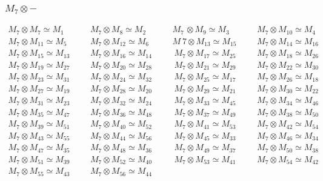 \subsubsection{$M_7\otimes -$}
\begin{align*}
M_{7} \otimes M_{7} \simeq M_{1} &&& M_{7} \otimes M_{8} \simeq M_{2} &&& M_{7\
} \otimes M_{9} \simeq M_{3} &&& M_{7} \otimes M_{10} \simeq M_{4}\\
M_{7} \otimes M_{11} \simeq M_{5} &&& M_{7} \otimes M_{12} \simeq M_{6} &&& M_\
{7} \otimes M_{13} \simeq M_{15} &&& M_{7} \otimes M_{14} \simeq M_{16}\\
M_{7} \otimes M_{15} \simeq M_{13} &&& M_{7} \otimes M_{16} \simeq M_{14} &&& \
M_{7} \otimes M_{17} \simeq M_{25} &&& M_{7} \otimes M_{18} \simeq M_{26}\\
M_{7} \otimes M_{19} \simeq M_{27} &&& M_{7} \otimes M_{20} \simeq M_{28} &&& \
M_{7} \otimes M_{21} \simeq M_{29} &&& M_{7} \otimes M_{22} \simeq M_{30}\\
M_{7} \otimes M_{23} \simeq M_{31} &&& M_{7} \otimes M_{24} \simeq M_{32} &&& \
M_{7} \otimes M_{25} \simeq M_{17} &&& M_{7} \otimes M_{26} \simeq M_{18}\\
M_{7} \otimes M_{27} \simeq M_{19} &&& M_{7} \otimes M_{28} \simeq M_{20} &&& \
M_{7} \otimes M_{29} \simeq M_{21} &&& M_{7} \otimes M_{30} \simeq M_{22}\\
M_{7} \otimes M_{31} \simeq M_{23} &&& M_{7} \otimes M_{32} \simeq M_{24} &&& \
M_{7} \otimes M_{33} \simeq M_{45} &&& M_{7} \otimes M_{34} \simeq M_{46}\\
M_{7} \otimes M_{35} \simeq M_{47} &&& M_{7} \otimes M_{36} \simeq M_{48} &&& \
M_{7} \otimes M_{37} \simeq M_{49} &&& M_{7} \otimes M_{38} \simeq M_{50}\\
M_{7} \otimes M_{39} \simeq M_{51} &&& M_{7} \otimes M_{40} \simeq M_{52} &&& \
M_{7} \otimes M_{41} \simeq M_{53} &&& M_{7} \otimes M_{42} \simeq M_{54}\\
M_{7} \otimes M_{43} \simeq M_{55} &&& M_{7} \otimes M_{44} \simeq M_{56} &&& \
M_{7} \otimes M_{45} \simeq M_{33} &&& M_{7} \otimes M_{46} \simeq M_{34}\\
M_{7} \otimes M_{47} \simeq M_{35} &&& M_{7} \otimes M_{48} \simeq M_{36} &&& \
M_{7} \otimes M_{49} \simeq M_{37} &&& M_{7} \otimes M_{50} \simeq M_{38}\\
M_{7} \otimes M_{51} \simeq M_{39} &&& M_{7} \otimes M_{52} \simeq M_{40} &&& \
M_{7} \otimes M_{53} \simeq M_{41} &&& M_{7} \otimes M_{54} \simeq M_{42}\\
M_{7} \otimes M_{55} \simeq M_{43} &&& M_{7} \otimes M_{56} \simeq M_{44}\\
\end{align*}

